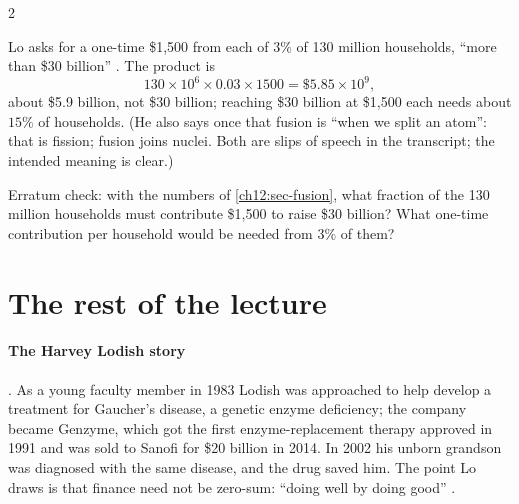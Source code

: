 \begin{paracol}{2}
\begin{coursenote}
Lo asks for a one-time \$1,500 from each of $3\%$ of 130 million households, ``more than \$30 billion''
. The product is
\[
  130\times10^{6}\times0.03\times1500=\$5.85\times10^{9},
\]
about \$5.9 billion, not \$30 billion; reaching \$30 billion at \$1,500 each needs about $15\%$ of households.
(He also says once that fusion is ``when we split an atom'': that is fission; fusion joins nuclei. Both are slips of
speech in the transcript; the intended meaning is clear.)
\end{coursenote}

\begin{exercise}
Erratum check: with the numbers of \cref{ch12:sec-fusion}, what fraction of the 130 million households must contribute \$1,500
to raise \$30 billion? What one-time contribution per household would be needed from $3\%$ of them?
\end{exercise}

\section{The rest of the lecture}\label{ch12:sec-rest}

\paragraph{The Harvey Lodish story} . As a young faculty member in 1983 Lodish was
approached to help develop a treatment for Gaucher's disease, a genetic enzyme deficiency; the company became Genzyme,
which got the first enzyme-replacement therapy approved in 1991 and was sold to Sanofi for \$20 billion in 2014.
In 2002 his unborn grandson was diagnosed with the same disease, and the drug saved him. The point Lo draws is that finance need not be
zero-sum: ``doing well by doing good'' .


\end{paracol}
